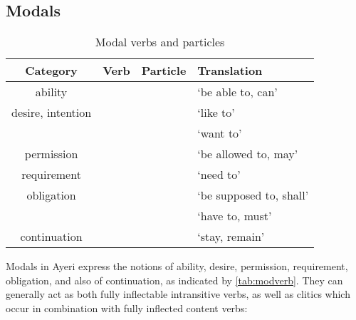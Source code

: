 

\subsection{Modals}
\label{subsec:modals}

\begin{table}
\caption{Modal verbs and particles}
\begin{tabu} to \linewidth {C[3] X[2] X[2] X[4]}
\tableheaderfont\toprule
Category
	& Verb
	& Particle
	& Translation
	\\
\toprule

ability
	&  
	&  
	& `be able to, can'
	\\
	
\midrule
	
desire, intention
	&  
	&  
	& `like to'
	\\
	
	&  
	&  
	& `want to'
	\\
	
\midrule

permission
	&  
	&  
	& `be allowed to, may'
	\\
	
\midrule

requirement
	&  
	&  
	& `need to'
	\\
	
\midrule

obligation
	&  
	&  
	& `be supposed to, shall'
	\\
	
	&  
	&  
	& `have to, must'
	\\
	
\midrule
	
continuation
	&  
	&  
	& `stay, remain'
	\\

\bottomrule
\end{tabu}
\label{tab:modverb}
\end{table}

Modals in Ayeri express the notions of ability, desire, permission,
requirement, obligation, and also of continuation, as indicated by
\autoref{tab:modverb}. They can generally act as both fully inflectable
intransitive verbs, as well as clitics which occur in combination with fully
inflected content verbs:

